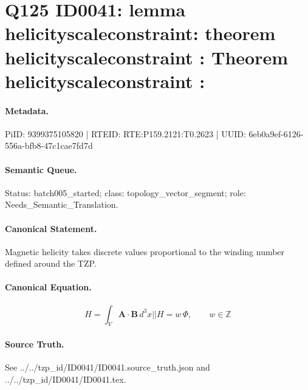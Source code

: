 \section*{Q125 ID0041: lemma helicityscaleconstraint: theorem helicityscaleconstraint : Theorem helicityscaleconstraint :}
\paragraph{Metadata.}
PiID: 9399375105820 | RTEID: RTE:P159.2121:T0.2623 | UUID: 6eb0a9ef-6126-556a-bfb8-47c1cae7fd7d

\paragraph{Semantic Queue.}
Status: batch005\_started; class: topology\_vector\_segment; role: Needs\_Semantic\_Translation.

\paragraph{Canonical Statement.}
Magnetic helicity takes discrete values proportional to the winding number defined around the TZP.

\paragraph{Canonical Equation.}
\[
H = \int_{V}\mathbf{A}\cdot\mathbf{B}\,d^{3}x || H = w\,\Phi, \qquad w \in \mathbb{Z}
\]

\paragraph{Source Truth.}
See ../../tzp\_id/ID0041/ID0041.source\_truth.json and ../../tzp\_id/ID0041/ID0041.tex.
